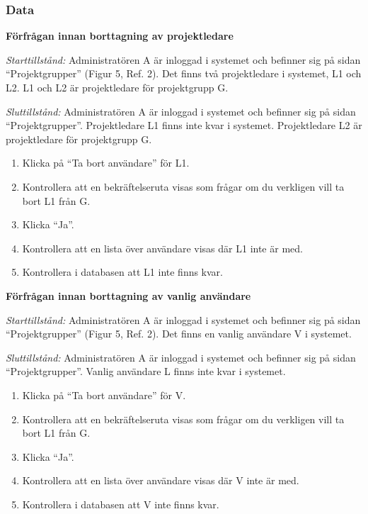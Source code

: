 \documentclass[a4paper]{article}
\begin{document}
\subsubsection{Data}
\begin{FT}
\item \textbf{Förfrågan innan borttagning av projektledare}

\emph{Starttillstånd:} Administratören A är inloggad i systemet och befinner sig på sidan ``Projektgrupper'' (Figur 5, Ref. 2). Det finns två projektledare i systemet, L1 och L2. L1 och L2 är projektledare för projektgrupp G.

\emph{Sluttillstånd:} Administratören A är inloggad i systemet och befinner sig på sidan ``Projektgrupper''. Projektledare L1 finns inte kvar i systemet. Projektledare L2 är projektledare för projektgrupp G.

\begin{enumerate}
\item Klicka på ``Ta bort användare'' för L1.
\item Kontrollera att en bekräftelseruta visas som frågar om du verkligen vill ta bort L1 från G.
\item Klicka ``Ja''.
\item Kontrollera att en lista över användare visas där L1 inte är med.
\item Kontrollera i databasen att L1 inte finns kvar.
\end{enumerate}

\item \textbf{Förfrågan innan borttagning av vanlig användare}

\emph{Starttillstånd:} Administratören A är inloggad i systemet och befinner sig på sidan ``Projektgrupper'' (Figur 5, Ref. 2). Det finns en vanlig användare V i systemet.

\emph{Sluttillstånd:} Administratören A är inloggad i systemet och befinner sig på sidan ``Projektgrupper''. Vanlig användare L finns inte kvar i systemet.

\begin{enumerate}
\item Klicka på ``Ta bort användare'' för V.
\item Kontrollera att en bekräftelseruta visas som frågar om du verkligen vill ta bort L1 från G.
\item Klicka ``Ja''.
\item Kontrollera att en lista över användare visas där V inte är med.
\item Kontrollera i databasen att V inte finns kvar.
\end{enumerate}


\end{FT}
\end{document}
